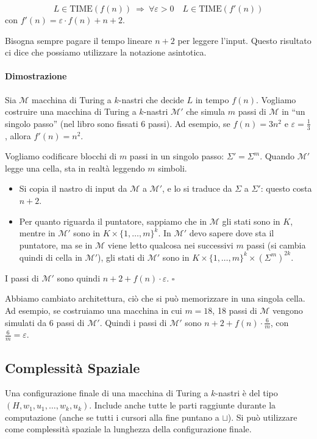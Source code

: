 \begin{theorem}
    $$
        L\in\text{TIME}(f(n))
        ~\Rightarrow~
        \forall\varepsilon>0\quad L\in\text{TIME}(f'(n))
    $$
    con $f'(n)=\varepsilon\cdot f(n)+n+2$.
\end{theorem}
Bisogna sempre pagare il tempo lineare $n+2$ per leggere l'input. Questo risultato ci dice che possiamo utilizzare la notazione asintotica.

\paragraph{Dimostrazione} Sia $\mathcal{M}$ macchina di Turing a $k$-nastri che decide $L$ in tempo $f(n)$. Vogliamo costruire una macchina di Turing a $k$-nastri $\mathcal{M}'$ che simula $m$ passi di $\mathcal{M}$ in ``un singolo passo'' (nel libro sono fissati 6 passi). Ad esempio, se $f(n)=3n^2$ e $\varepsilon=\frac{1}{3}$, allora $f'(n)=n^2$.

Vogliamo codificare blocchi di $m$ passi in un singolo passo: $\Sigma'=\Sigma^m$. Quando $\mathcal{M}'$ legge una cella, sta in realtà leggendo $m$ simboli. 
\begin{itemize}
    \item Si copia il nastro di input da $\mathcal{M}$ a $\mathcal{M}'$, e lo si traduce da $\Sigma$ a $\Sigma'$: questo costa $n+2$.
    \item Per quanto riguarda il puntatore, sappiamo che in $\mathcal{M}$ gli stati sono in $K$, mentre in $\mathcal{M}'$ sono in $K\times\{1,\dots,m\}^k$. In $\mathcal{M}'$ devo sapere dove sta il puntatore, ma se in $\mathcal{M}$ viene letto qualcosa nei successivi $m$ passi (si cambia quindi di cella in $\mathcal{M}'$), gli stati di $\mathcal{M}'$ sono in $K\times\{1,\dots,m\}^k\times (\Sigma^m)^{2k}$.
\end{itemize}
I passi di $\mathcal{M}'$ sono quindi $n+2+f(n)\cdot\varepsilon$. \hfill $\square$\medskip

Abbiamo cambiato architettura, ciò che si può memorizzare in una singola cella. Ad esempio, se costruiamo una macchina in cui $m=18$, 18 passi di $\mathcal{M}$ vengono simulati da 6 passi di $\mathcal{M}'$. Quindi i passi di $\mathcal{M}'$ sono $n+2+f(n)\cdot\frac{6}{m}$, con $\frac{6}{m}=\varepsilon$.





\subsection{Complessità Spaziale}
Una configurazione finale di una macchina di Turing a $k$-nastri è del tipo $(H,w_1,u_1,\dots,w_k,u_k)$. Include anche tutte le parti raggiunte durante la computazione (anche se tutti i cursori alla fine puntano a $\sqcup$). Si può utilizzare come complessità spaziale la lunghezza della configurazione finale.

